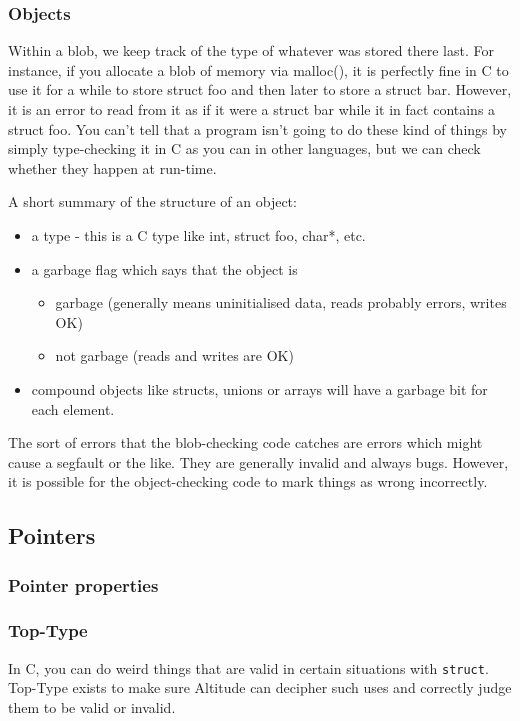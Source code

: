 \subsubsection{Objects}
Within a blob, we keep track of the type of whatever was stored there last. For instance, if you allocate a blob of memory via malloc(), it is perfectly fine in C to use it for a while to store struct foo and then later to store a struct bar. However, it is an error to read from it as if it were a struct bar while it in fact contains a struct foo. You can't tell that a program isn't going to do these kind of things by simply type-checking it in C as you can in other languages, but we can check whether they happen at run-time. 
\par
A short summary of the structure of an object:
\begin{itemize}
\item a type - this is a C type like int, struct foo, char*, etc. 
\item a garbage flag which says that the object is
  \begin{itemize}
  \item garbage (generally means uninitialised data, reads probably errors, writes OK) 
  \item not garbage (reads and writes are OK) 
  \end{itemize}
\item compound objects like structs, unions or arrays will have a garbage bit for each element. 
\end{itemize}
The sort of errors that the blob-checking code catches are errors which might cause a segfault or the like. They are generally invalid and always bugs. However, it is possible for the object-checking code to mark things as wrong incorrectly.

\subsection{Pointers}
\subsubsection{Pointer properties}
\subsubsection{Top-Type}
In C, you can do weird things that are valid in certain situations with {\tt struct}. Top-Type exists to make sure Altitude can decipher such uses and correctly judge them to be valid or invalid.

